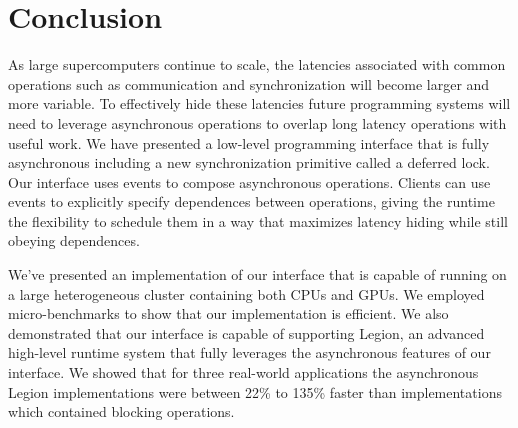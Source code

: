
\section{Conclusion}
\label{sec:conclusion}

As large supercomputers continue to scale, the latencies associated
with common operations such as communication and synchronization will
become larger and more variable.  To effectively hide these latencies
future programming systems will need to leverage asynchronous operations
to overlap long latency operations with useful work.  We have
presented a low-level programming interface that is fully asynchronous
including a new synchronization primitive called a deferred lock.
Our interface uses events to compose asynchronous operations.  Clients
can use events to explicitly specify dependences between operations,
giving the runtime the flexibility to schedule them in a way that maximizes latency 
hiding while still obeying dependences.

We've presented an implementation of our interface that is capable of running
on a large heterogeneous cluster containing both CPUs and GPUs.  We
employed micro-benchmarks to show that our implementation is efficient.
We also demonstrated that our interface is capable of supporting Legion,
an advanced high-level runtime system that fully leverages the asynchronous
features of our interface.  We showed that for three real-world applications
the asynchronous Legion implementations were between 22\% to 135\% faster than
implementations which contained blocking operations.


